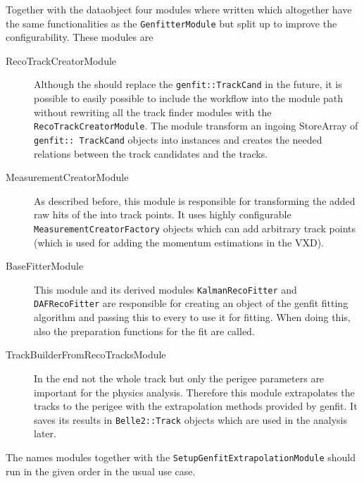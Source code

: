 Together with the \RecoTrack dataobject four modules where written which altogether have the same functionalities as the \texttt{GenfitterModule} but split up to improve the configurability. These modules are
\begin{description}
 \item[RecoTrackCreatorModule] Although the \RecoTrack should replace the \texttt{genfit::Track\-Cand} in the future, it is possible to easily possible to include the \RecoTrack workflow into the module path without rewriting all the track finder modules with the \texttt{Reco\-Track\-Creator\-Module}. The module transform an ingoing StoreArray of \texttt{genfit::\ Track\-Cand} objects into \RecoTrack instances and creates the needed relations between the track candidates and the tracks.
 \item[MeasurementCreatorModule] As described before, this module is responsible for transforming the added raw hits of the \RecoTrack into track points. It uses highly configurable \texttt{MeasurementCreatorFactory} objects which can add arbitrary track points (which is used for adding the momentum estimations in the VXD).
 \item[BaseFitterModule] This module and its derived modules \texttt{KalmanRecoFitter} and \texttt{DAF\-Reco\-Fitter} are responsible for creating an object of the genfit fitting algorithm and passing this to every \RecoTrack to use it for fitting. When doing this, also the preparation functions for the fit are called.
 \item[TrackBuilderFromRecoTracksModule] In the end not the whole track but only the perigee parameters are important for the physics analysis. Therefore this module extrapolates the tracks to the perigee with the extrapolation methods provided by genfit. It saves its results in \texttt{Belle2::Track} objects which are used in the analysis later.
\end{description}

The names modules together with the \texttt{SetupGenfitExtrapolationModule} should run in the given order in the usual use case.



